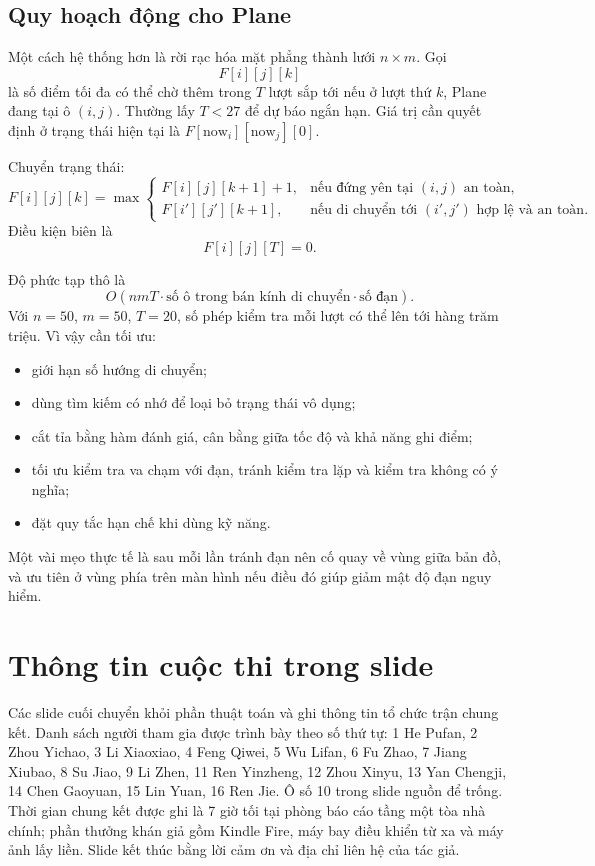 \documentclass[11pt]{article}
\begin{document}
\subsection{Quy hoạch động cho Plane}

Một cách hệ thống hơn là rời rạc hóa mặt phẳng thành lưới \(n\times m\). Gọi
\[
  F[i][j][k]
\]
là số điểm tối đa có thể chờ thêm trong \(T\) lượt sắp tới nếu ở lượt thứ
\(k\), Plane đang tại ô \((i,j)\). Thường lấy \(T<27\) để dự báo ngắn hạn.
Giá trị cần quyết định ở trạng thái hiện tại là \(F[\text{now}_i][\text{now}_j][0]\).

Chuyển trạng thái:
\[
F[i][j][k]=
\max\begin{cases}
F[i][j][k+1]+1, & \text{nếu đứng yên tại }(i,j)\text{ an toàn},\\
F[i'][j'][k+1], & \text{nếu di chuyển tới }(i',j')\text{ hợp lệ và an toàn}.
\end{cases}
\]
Điều kiện biên là
\[
  F[i][j][T]=0.
\]

Độ phức tạp thô là
\[
  O(nmT\cdot\text{số ô trong bán kính di chuyển}\cdot\text{số đạn}).
\]
Với \(n=50\), \(m=50\), \(T=20\), số phép kiểm tra mỗi lượt có thể lên tới
hàng trăm triệu. Vì vậy cần tối ưu:
\begin{itemize}
  \item giới hạn số hướng di chuyển;
  \item dùng tìm kiếm có nhớ để loại bỏ trạng thái vô dụng;
  \item cắt tỉa bằng hàm đánh giá, cân bằng giữa tốc độ và khả năng ghi điểm;
  \item tối ưu kiểm tra va chạm với đạn, tránh kiểm tra lặp và kiểm tra không
        có ý nghĩa;
  \item đặt quy tắc hạn chế khi dùng kỹ năng.
\end{itemize}
Một vài mẹo thực tế là sau mỗi lần tránh đạn nên cố quay về vùng giữa bản đồ,
và ưu tiên ở vùng phía trên màn hình nếu điều đó giúp giảm mật độ đạn nguy
hiểm.

\section{Thông tin cuộc thi trong slide}

Các slide cuối chuyển khỏi phần thuật toán và ghi thông tin tổ chức trận chung
kết. Danh sách người tham gia được trình bày theo số thứ tự: 1 He Pufan, 2
Zhou Yichao, 3 Li Xiaoxiao, 4 Feng Qiwei, 5 Wu Lifan, 6 Fu Zhao, 7 Jiang
Xiubao, 8 Su Jiao, 9 Li Zhen, 11 Ren Yinzheng, 12 Zhou Xinyu, 13 Yan Chengji,
14 Chen Gaoyuan, 15 Lin Yuan, 16 Ren Jie. Ô số 10 trong slide nguồn để trống.
Thời gian chung kết được ghi là 7 giờ tối tại phòng báo cáo tầng một tòa nhà
chính; phần thưởng khán giả gồm Kindle Fire, máy bay điều khiển từ xa và máy
ảnh lấy liền. Slide kết thúc bằng lời cảm ơn và địa chỉ liên hệ của tác giả.
\end{document}
